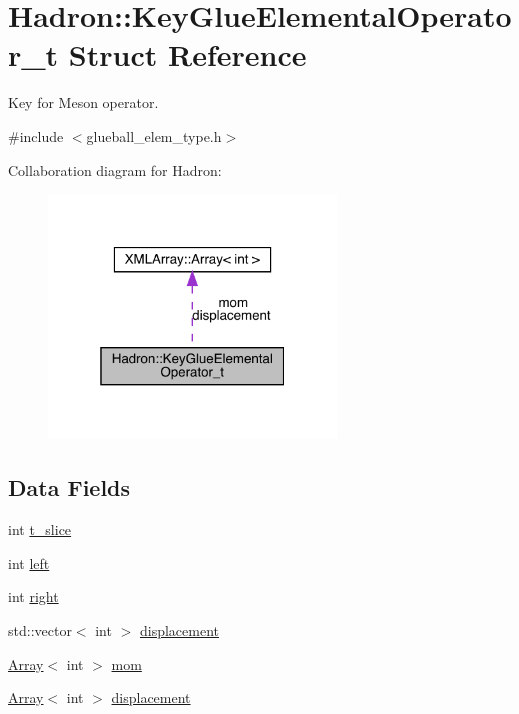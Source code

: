 \hypertarget{structHadron_1_1KeyGlueElementalOperator__t}{}\section{Hadron\+:\+:Key\+Glue\+Elemental\+Operator\+\_\+t Struct Reference}
\label{structHadron_1_1KeyGlueElementalOperator__t}


Key for Meson operator.  




{\ttfamily \#include $<$glueball\+\_\+elem\+\_\+type.\+h$>$}



Collaboration diagram for Hadron\+:\nopagebreak
\begin{figure}[H]
\begin{center}
\leavevmode
\includegraphics[width=217pt]{d1/df7/structHadron_1_1KeyGlueElementalOperator__t__coll__graph}
\end{center}
\end{figure}
\subsection*{Data Fields}
\begin{DoxyCompactItemize}
\item 
int \mbox{\hyperlink{structHadron_1_1KeyGlueElementalOperator__t_a678f4b074f03c2acbedf72f3458fbbb6}{t\+\_\+slice}}
\item 
int \mbox{\hyperlink{structHadron_1_1KeyGlueElementalOperator__t_a8644909a558d258728465b7cd3f4aa44}{left}}
\item 
int \mbox{\hyperlink{structHadron_1_1KeyGlueElementalOperator__t_a81292d0ee6bd97ac66b0f100c94b1010}{right}}
\item 
std\+::vector$<$ int $>$ \mbox{\hyperlink{structHadron_1_1KeyGlueElementalOperator__t_a19998afcb878e76f5eb3146a057e29b5}{displacement}}
\item 
\mbox{\hyperlink{classXMLArray_1_1Array}{Array}}$<$ int $>$ \mbox{\hyperlink{structHadron_1_1KeyGlueElementalOperator__t_acc0e7e9420491261bf7c7199ae522664}{mom}}
\item 
\mbox{\hyperlink{classXMLArray_1_1Array}{Array}}$<$ int $>$ \mbox{\hyperlink{structHadron_1_1KeyGlueElementalOperator__t_a056a980dbceea278f9a4020ae269396e}{displacement}}
\end{DoxyCompactItemize}



